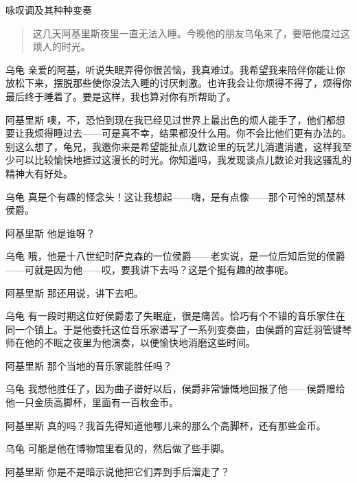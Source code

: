 
\begin{dialog}{咏叹调及其种种变奏}

\begin{quote}
这几天阿基里斯夜里一直无法入睡。今晚他的朋友乌龟来了，要陪他度过这烦人的时光。
\end{quote}

\begin{dialogue}

\item[乌龟]亲爱的阿基，听说失眠弄得你很苦恼，我真难过。我希望我来陪伴你能让你放松下来，摆脱那些使你没法入睡的讨厌刺激。也许我会让你烦得不得了，烦得你最后终于睡着了。要是这样，我也算对你有所帮助了。

\item[阿基里斯]噢，不，恐怕到现在我已经见过世界上最出色的烦人能手了，他们都想要让我烦得睡过去——可是真不幸，结果都没什么用。你不会比他们更有办法的。别这么想了，龟兄，我邀你来是希望能扯点儿数论里的玩艺儿消遣消遣，这样我至少可以比较愉快地捱过这漫长的时光。你知道吗，我发现谈点儿数论对我这骚乱的精神大有好处。

\item[乌龟]真是个有趣的怪念头！这让我想起——嗨，是有点像——那个可怜的凯瑟林侯爵。

\item[阿基里斯]他是谁呀？

\item[乌龟]哦，他是十八世纪时萨克森的一位侯爵——老实说，是一位后知后觉的侯爵——可就是因为他——哎，要我讲下去吗？这是个挺有趣的故事呢。

\item[阿基里斯]那还用说，讲下去吧。

\item[乌龟]有一段时期这位好侯爵患了失眠症，很是痛苦。恰巧有个不错的音乐家住在同一个镇上。于是他委托这位音乐家谱写了一系列变奏曲，由侯爵的宫廷羽管键琴师在他的不眠之夜里为他演奏，以便愉快地消磨这些时间。

\item[阿基里斯]那个当地的音乐家能胜任吗？

\item[乌龟]我想他胜任了，因为曲子谱好以后，侯爵非常慷慨地回报了他——侯爵赠给他一只金质高脚杯，里面有一百枚金币。

\item[阿基里斯]真的吗？我首先得知道他哪儿来的那么个高脚杯，还有那些金币。

\item[乌龟]可能是他在博物馆里看见的，然后做了些手脚。

\item[阿基里斯]你是不是暗示说他把它们弄到手后溜走了？


\end{dialogue}
\end{dialog}
